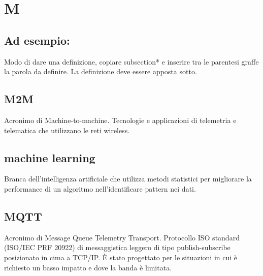 \section*{M}
\markright{}
\subsection*{Ad esempio:}
Modo di dare una definizione, copiare subsection*{} e inserire tra le parentesi graffe la parola da definire. La definizione deve essere apposta sotto.
\subsection*{M2M}
Acronimo di Machine-to-machine. Tecnologie e applicazioni di telemetria e telematica che utilizzano le reti wireless.
\subsection*{machine learning}
Branca dell'intelligenza artificiale che utilizza metodi statistici per migliorare la performance di un algoritmo nell'identificare pattern nei dati.
\subsection*{MQTT}
Acronimo di Message Queue Telemetry Transport. Protocollo ISO standard (ISO/IEC PRF 20922) di messaggistica leggero di tipo publish-subscribe posizionato in cima a TCP/IP. È stato progettato per le situazioni in cui è richiesto un basso impatto e dove la banda è limitata. 

